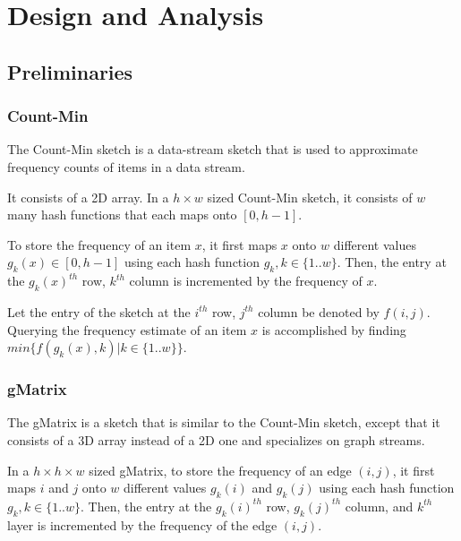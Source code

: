 
\chapter{Design and Analysis}

\ifpdf
    \graphicspath{{Chapter2/Figs/Raster/}{Chapter2/Figs/PDF/}{Chapter2/Figs/}}
\else
    \graphicspath{{Chapter2/Figs/Vector/}{Chapter2/Figs/}}
\fi


\section{Preliminaries}

\subsection{Count-Min}
The Count-Min\cite{cormode2005improved} sketch is a data-stream sketch that is used to approximate frequency counts of items in a data stream.

It consists of a 2D array. In a $h \times w$ sized Count-Min sketch, it consists of $w$ many hash functions that each maps onto $[0,h-1]$.

To store the frequency of an item $x$, it first maps $x$ onto $w$ different values $g_k(x) \in [0,h-1]$ using each hash function $g_k, k \in \{1..w\}$. Then, the entry at the $g_k(x)^{th}$ row, $k^{th}$ column is incremented by the frequency of $x$.

Let the entry of the sketch at the $i^{th}$ row, $j^{th}$ column be denoted by $f(i,j)$. Querying the frequency estimate of an item $x$ is accomplished by finding $min\{f(g_k(x),k)|k \in \{1..w\}\}$.

\subsection{gMatrix}
The gMatrix\cite{khan} is a sketch that is similar to the Count-Min sketch, except that it consists of a 3D array instead of a 2D one and specializes on graph streams.

In a $h \times h \times w$ sized gMatrix, to store the frequency of an edge $(i,j)$, it first maps $i$ and $j$ onto $w$ different values $g_k(i)$ and $g_k(j)$ using each hash function $g_k, k \in \{1..w\}$. Then, the entry at the $g_k(i)^{th}$ row, $g_k(j)^{th}$ column, and $k^{th}$ layer is incremented by the frequency of the edge $(i,j)$.


